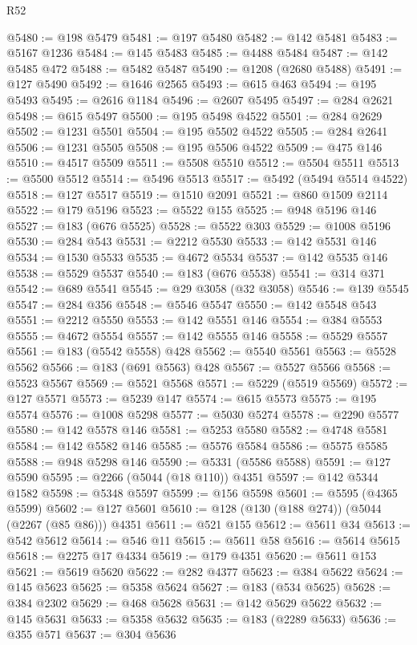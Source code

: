 \begin{lexlean}{R52}
\begin{coremodule}
@5480 := @198 @5479
@5481 := @197 @5480
@5482 := @142 @5481
@5483 := @5167 @1236
@5484 := @145 @5483
@5485 := @4488 @5484
@5487 := @142 @5485 @472
@5488 := @5482 @5487
@5490 := @1208 (@2680 @5488)
@5491 := @127 @5490
@5492 := @1646 @2565
@5493 := @615 @463
@5494 := @195 @5493
@5495 := @2616 @1184
@5496 := @2607 @5495
@5497 := @284 @2621
@5498 := @615 @5497
@5500 := @195 @5498 @4522
@5501 := @284 @2629
@5502 := @1231 @5501
@5504 := @195 @5502 @4522
@5505 := @284 @2641
@5506 := @1231 @5505
@5508 := @195 @5506 @4522
@5509 := @475 @146
@5510 := @4517 @5509
@5511 := @5508 @5510
@5512 := @5504 @5511
@5513 := @5500 @5512
@5514 := @5496 @5513
@5517 := @5492 (@5494 @5514 @4522)
@5518 := @127 @5517
@5519 := @1510 @2091
@5521 := @860 @1509 @2114
@5522 := @179 @5196
@5523 := @5522 @155
@5525 := @948 @5196 @146
@5527 := @183 (@676 @5525)
@5528 := @5522 @303
@5529 := @1008 @5196
@5530 := @284 @543
@5531 := @2212 @5530
@5533 := @142 @5531 @146
@5534 := @1530 @5533
@5535 := @4672 @5534
@5537 := @142 @5535 @146
@5538 := @5529 @5537
@5540 := @183 (@676 @5538)
@5541 := @314 @371
@5542 := @689 @5541
@5545 := @29 @3058 (@32 @3058)
@5546 := @139 @5545
@5547 := @284 @356
@5548 := @5546 @5547
@5550 := @142 @5548 @543
@5551 := @2212 @5550
@5553 := @142 @5551 @146
@5554 := @384 @5553
@5555 := @4672 @5554
@5557 := @142 @5555 @146
@5558 := @5529 @5557
@5561 := @183 (@5542 @5558) @428
@5562 := @5540 @5561
@5563 := @5528 @5562
@5566 := @183 (@691 @5563) @428
@5567 := @5527 @5566
@5568 := @5523 @5567
@5569 := @5521 @5568
@5571 := @5229 (@5519 @5569)
@5572 := @127 @5571
@5573 := @5239 @147
@5574 := @615 @5573
@5575 := @195 @5574
@5576 := @1008 @5298
@5577 := @5030 @5274
@5578 := @2290 @5577
@5580 := @142 @5578 @146
@5581 := @5253 @5580
@5582 := @4748 @5581
@5584 := @142 @5582 @146
@5585 := @5576 @5584
@5586 := @5575 @5585
@5588 := @948 @5298 @146
@5590 := @5331 (@5586 @5588)
@5591 := @127 @5590
@5595 := @2266 (@5044 (@18 @110)) @4351
@5597 := @142 @5344 @1582
@5598 := @5348 @5597
@5599 := @156 @5598
@5601 := @5595 (@4365 @5599)
@5602 := @127 @5601
@5610 := @128 (@130 (@188 @274)) (@5044 (@2267 (@85 @86))) @4351
@5611 := @521 @155
@5612 := @5611 @34
@5613 := @542 @5612
@5614 := @546 @11
@5615 := @5611 @58
@5616 := @5614 @5615
@5618 := @2275 @17 @4334
@5619 := @179 @4351
@5620 := @5611 @153
@5621 := @5619 @5620
@5622 := @282 @4377
@5623 := @384 @5622
@5624 := @145 @5623
@5625 := @5358 @5624
@5627 := @183 (@534 @5625)
@5628 := @384 @2302
@5629 := @468 @5628
@5631 := @142 @5629 @5622
@5632 := @145 @5631
@5633 := @5358 @5632
@5635 := @183 (@2289 @5633)
@5636 := @355 @571
@5637 := @304 @5636

\end{coremodule}
\end{lexlean}

